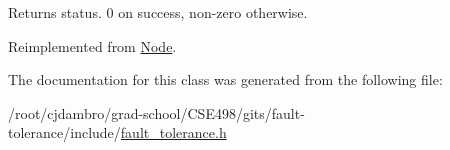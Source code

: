 \begin{DoxyReturn}{Returns}
status. 0 on success, non-\/zero otherwise. 
\end{DoxyReturn}


Reimplemented from \hyperlink{classNode_acfbc12d3b7d414fb12811041b04a1809}{Node}.



The documentation for this class was generated from the following file\-:\begin{DoxyCompactItemize}
\item 
/root/cjdambro/grad-\/school/\-C\-S\-E498/gits/fault-\/tolerance/include/\hyperlink{fault__tolerance_8h}{fault\-\_\-tolerance.\-h}\end{DoxyCompactItemize}
